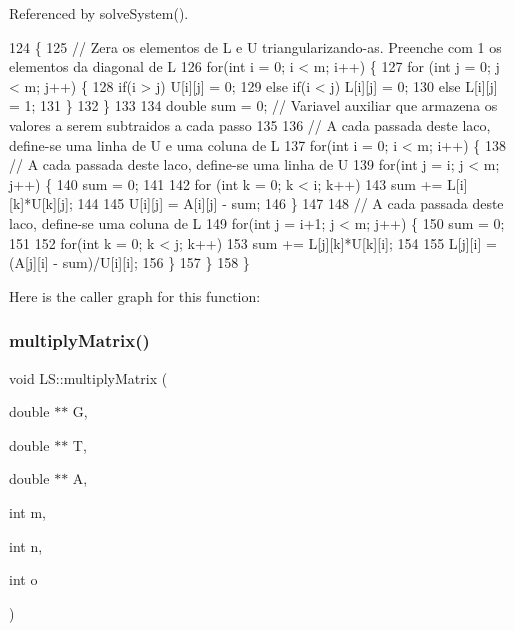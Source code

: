 Referenced by solve\+System().


\begin{DoxyCode}
124                                                       \{
125     \textcolor{comment}{// Zera os elementos de L e U triangularizando-as. Preenche com 1 os elementos da diagonal de L}
126     \textcolor{keywordflow}{for}(\textcolor{keywordtype}{int} i = 0; i < m; i++) \{
127         \textcolor{keywordflow}{for} (\textcolor{keywordtype}{int} j = 0; j < m; j++) \{
128             \textcolor{keywordflow}{if}(i > j) U[i][j] = 0;
129             \textcolor{keywordflow}{else} \textcolor{keywordflow}{if}(i < j) L[i][j] = 0;
130             \textcolor{keywordflow}{else} L[i][j] = 1;
131         \}
132     \}
133 
134     \textcolor{keywordtype}{double} sum = 0; \textcolor{comment}{// Variavel auxiliar que armazena os valores a serem subtraidos a cada passo}
135 
136     \textcolor{comment}{// A cada passada deste laco, define-se uma linha de U e uma coluna de L}
137     \textcolor{keywordflow}{for}(\textcolor{keywordtype}{int} i = 0; i < m; i++) \{
138         \textcolor{comment}{// A cada passada deste laco, define-se uma linha de U}
139         \textcolor{keywordflow}{for}(\textcolor{keywordtype}{int} j = i; j < m; j++) \{
140             sum = 0;
141 
142             \textcolor{keywordflow}{for} (\textcolor{keywordtype}{int} k = 0; k < i; k++)
143                 sum += L[i][k]*U[k][j];
144 
145             U[i][j] = A[i][j] - sum;
146         \}
147 
148         \textcolor{comment}{// A cada passada deste laco, define-se uma coluna de L}
149         \textcolor{keywordflow}{for}(\textcolor{keywordtype}{int} j = i+1; j < m; j++) \{
150             sum = 0;
151 
152             \textcolor{keywordflow}{for}(\textcolor{keywordtype}{int} k = 0; k < j; k++)
153                 sum += L[j][k]*U[k][i];
154 
155             L[j][i] = (A[j][i] - sum)/U[i][i];
156         \}
157     \}
158 \}
\end{DoxyCode}
Here is the caller graph for this function\+:
\mbox{\label{class_l_s_a067388604231d6870b42b1e8356c06b5}} 
\subsubsection{\texorpdfstring{multiply\+Matrix()}{multiplyMatrix()}\hspace{0.1cm}{\footnotesize\ttfamily [1/2]}}
{\footnotesize\ttfamily void L\+S\+::multiply\+Matrix (\begin{DoxyParamCaption}\item[{double $\ast$$\ast$}]{G,  }\item[{double $\ast$$\ast$}]{T,  }\item[{double $\ast$$\ast$}]{A,  }\item[{int}]{m,  }\item[{int}]{n,  }\item[{int}]{o }\end{DoxyParamCaption})\hspace{0.3cm}{\ttfamily [private]}}



